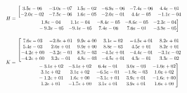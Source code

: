 \begin{equation}\label{Kstructure1}
\scalebox{0.5}{$H=
\!\begin{aligned}
&
\left[\begin{matrix}
  3.5e-06 & -3.0e-07 &  1.5e-02 & -6.9e-06 & -7.4e-06 &  4.4e-01 \\
  -2.0e-02 & -7.5e-06 &  1.6e-05 & -2.0e-01 &  4.4e-05 & -1.1e-04
\end{matrix}\right.\\
&\qquad\qquad
\left.\begin{matrix}
  {}1.8e-04 &  1.1e-04 & -8.4e-05 & -8.6e-05 & -2.3e-04\\
  {}-9.2e-05 & -9.1e-05 &  7.4e-06 &  7.6e-01 & -3.9e-05
\end{matrix}\right]
\end{aligned}$}
\end{equation}
 \begin{equation}\label{Kstructure2}
\scalebox{0.5}{$K=
\!\begin{aligned}
&
\left[\begin{matrix}
  7.6e-03 & -2.0e+01 &  9.9e+00 &  3.1e-02 & -4.5e+01 &  8.2e+01 \\
  5.4e-03 &  2.0e+01 &  9.9e+00 &  8.8e-03 &  4.5e+01 &  8.2e+01 \\
  -4.2e+00 & -3.2e-01 &  8.7e-03 & -4.5e+01 & -4.4e-01 & -3.1e-02 \\
  -4.2e+00 &  3.2e-01 &  4.8e-03 & -4.5e+01 &  4.3e-01 &  3.3e-02
\end{matrix}\right.\\
&\qquad\qquad
\left.\begin{matrix}
  {}-3.1e+02 & -3.1e+02 &  6.4e-01 &  3.0e-03 & -1.0e+02\\
  {}3.1e+02 &  3.1e+02 & -6.5e-01 & -1.9e-03 &  1.0e+02 \\
  {}-1.2e+01 &  1.6e+00 & -3.1e+01 &  3.9e+01 & -1.6e+00 \\
  {}1.2e+01 & -1.7e+00 &  3.1e+01 &  3.9e+01 &  1.6e+00
\end{matrix}\right]
\end{aligned}$}
\end{equation}



